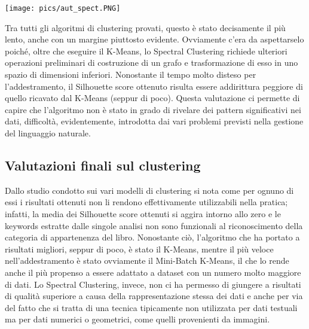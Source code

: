 \documentclass[12pt,oneside]{article}
\begin{document}
\begin{enumerate}
    \texttt{[image: pics/aut\_spect.PNG]}
    
    \begin{justify}
    Tra tutti gli algoritmi di clustering provati, questo è stato decisamente il più lento, anche con un margine piuttosto evidente. Ovviamente c’era da aspettarselo poiché, oltre che eseguire il K-Means, lo Spectral Clustering richiede ulteriori operazioni preliminari di costruzione di un grafo e trasformazione di esso in uno spazio di dimensioni inferiori. Nonostante il tempo molto disteso per l’addestramento, il Silhouette score ottenuto risulta essere addirittura peggiore di quello ricavato dal K-Means (seppur di poco). Questa valutazione ci permette di capire che l’algoritmo non è stato in grado di rivelare dei pattern significativi nei dati, difficoltà, evidentemente, introdotta dai vari problemi previsti nella gestione del linguaggio naturale.
    \end{justify}
    \end{enumerate}

    \begin{enumerate}
    \subsection{Valutazioni finali sul clustering}
    \begin{justify}
        Dallo studio condotto sui vari modelli di clustering si nota come per ognuno di essi i risultati ottenuti non li rendono effettivamente utilizzabili nella pratica; infatti, la media dei Silhouette score ottenuti si aggira intorno allo zero e le keywords estratte dalle singole analisi non sono funzionali al riconoscimento della categoria di appartenenza del libro. 
        Nonostante ciò, l’algoritmo che ha portato a risultati migliori, seppur di poco, è stato il K-Means, mentre il più veloce nell’addestramento è stato ovviamente il Mini-Batch K-Means, il che lo rende anche il più propenso a essere adattato a dataset con un numero molto maggiore di dati.
        Lo Spectral Clustering, invece, non ci ha permesso di giungere a risultati di qualità superiore a causa della rappresentazione stessa dei dati e anche per via del fatto che si tratta di una tecnica tipicamente non utilizzata per dati testuali ma per dati numerici o geometrici, come quelli provenienti da immagini.
    \end{justify}
    \end{enumerate}
\end{document}
